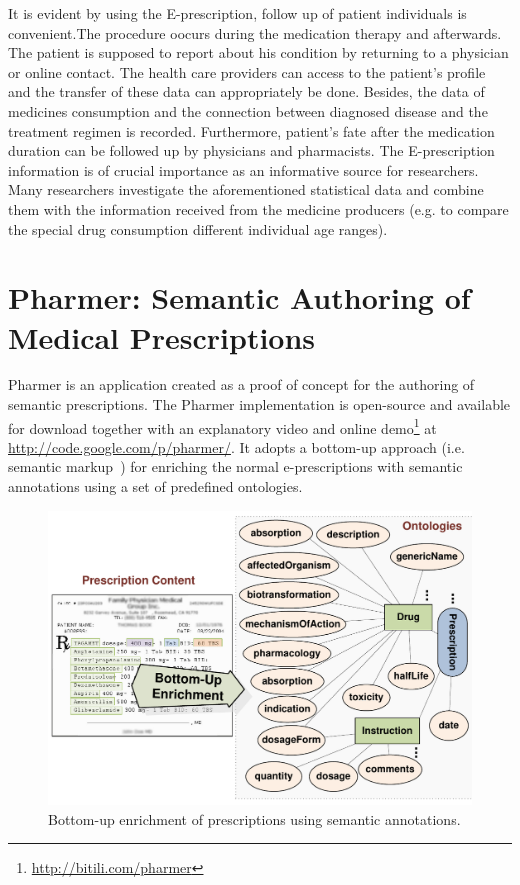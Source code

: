 \documentclass[10pt, conference, compsocconf]{IEEEtran}
\begin{document}
It is evident by using the E-prescription, follow up of patient individuals is convenient.The procedure oocurs during the medication therapy and afterwards. The patient is supposed to report about his condition by returning to a physician or online contact.
The health care providers can access to the patient's profile and the transfer of these data can appropriately be done.
Besides, the data of medicines consumption and the connection between diagnosed disease and the treatment regimen is recorded.
Furthermore, patient's fate after the medication duration can be followed up by physicians and pharmacists.
The E-prescription information is  of crucial importance as an  informative source for researchers.
Many researchers investigate the aforementioned statistical data and combine them with the information received from the medicine producers (e.g. to compare the special drug consumption different  individual age ranges).

\section{Pharmer: Semantic Authoring of Medical Prescriptions}
\label{pharmer}
Pharmer is an application created as a proof of concept for the authoring of semantic prescriptions.
The Pharmer implementation is open-source and available for download together with an explanatory video and online demo\footnote{\url{http://bitili.com/pharmer}} at \url{http://code.google.com/p/pharmer/}.
It adopts a bottom-up approach (i.e. semantic markup~\cite{araujo2010}) for enriching the normal e-prescriptions with semantic annotations using a set of predefined ontologies.

\begin{figure}[tb]
	\centering
		\includegraphics[width=1.0\columnwidth]{images/approaches.pdf}
	\caption{Bottom-up enrichment of prescriptions using semantic annotations.}
	\label{fig:botup}
\end{figure}
\end{document}
